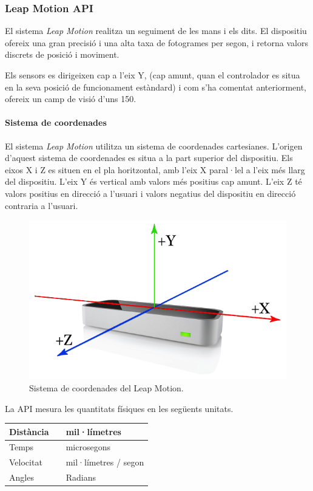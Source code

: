 \documentclass[12pt,a4paper,catalan]{article}
\begin{document}
	\subsubsection{Leap Motion API}
	El sistema \textit{Leap Motion} realitza un seguiment de les mans i els dits. El dispositiu ofereix una gran precisió i una alta taxa de fotogrames per segon, i retorna valors discrets de posició i moviment.
	
	Els sensors es dirigeixen cap a l'eix Y, (cap amunt, quan el controlador es situa en la seva posició de funcionament estàndard) i com s'ha comentat anteriorment, ofereix un camp de visió d'uns 150\textdegree.
	\paragraph{Sistema de coordenades}
	El sistema \textit{Leap Motion} utilitza un sistema de coordenades cartesianes. L'origen d'aquest sistema de coordenades es situa a la part superior del dispositiu. Els eixos X i Z es situen en el pla horitzontal, amb l'eix X paral·lel a l'eix més llarg del dispositiu. L'eix Y és vertical amb valors més positius cap amunt. L'eix Z té valors positius en direcció a l'usuari i valors negatius del dispositiu en direcció contraria a l'usuari.
	\begin{figure}[H]
		\includegraphics[width=\textwidth,keepaspectratio]{leap-coordinates.png}
		\centering
		\caption{Sistema de coordenades del Leap Motion.}
		\label{fig:leap-coordinates}
	\end{figure}
	La API mesura les quantitats físiques en les següents unitats.\\
	
	\begin{tabular}{ l c l }
		\hline
		Distància & & mil·límetres\\ \hline
		Temps & & microsegons\\ \hline
		Velocitat & &  mil·límetres / segon\\ \hline
		Angles & & Radians\\
	\end{tabular}
	
\end{document}
